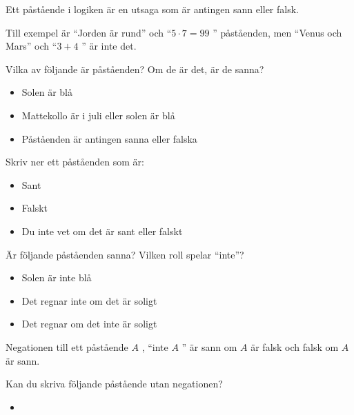 
\begin{definition}[Påstående]
	Ett påstående i logiken är en utsaga som är antingen sann eller falsk. 
\end{definition}

Till exempel är ``Jorden är rund'' och ``\(5 \cdot 7 = 99\) '' påståenden, men ``Venus och Mars'' och ``\(3 + 4\) '' är inte det.

\begin{problem}
	Vilka av följande är påståenden? Om de är det, är de sanna?
	\begin{itemize}
		\item Solen är blå
		\item Mattekollo är i juli eller solen är blå
		\item Påståenden är antingen sanna eller falska
	\end{itemize}
\end{problem} 

\begin{problem}
	Skriv ner ett påståenden som är: 
	\begin{itemize}
		\item Sant
		\item Falskt
		\item Du inte vet om det är sant eller falskt
	\end{itemize}
\end{problem}

\begin{problem}
	Är följande påståenden sanna? Vilken roll spelar ``inte''?
	\begin{itemize}
		\item Solen är inte blå
		\item Det regnar inte om det är soligt
		\item Det regnar om det inte är soligt
	\end{itemize}
\end{problem}

\begin{definition}[Negation]
	Negationen till ett påstående \(A\) , ``inte \(A\) '' är sann om \(A\) är falsk och falsk om \(A\) är sann.
\end{definition}

\begin{problem}
	Kan du skriva följande påstående utan negationen?
	\begin{itemize}
		\item 
	\end{itemize}
\end{problem}



